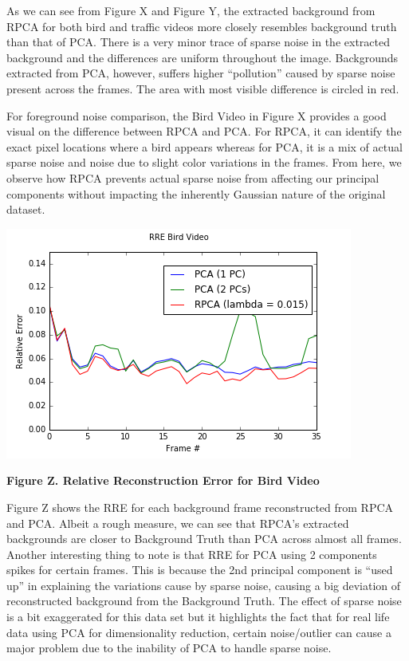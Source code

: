 \documentclass[11pt]{scrartcl} %
\theoremstyle{plain}
\begin{document}
As we can see from Figure X and Figure Y, the extracted background from RPCA for both bird and traffic videos more closely resembles background truth than that of PCA. There is a very minor trace of sparse noise in the extracted background and the differences are uniform throughout the image. Backgrounds extracted from PCA, however, suffers higher “pollution” caused by sparse noise present across the frames. The area with most visible difference is circled in red.

For foreground noise comparison, the Bird Video in Figure X provides a good visual on the difference between RPCA and PCA. For RPCA, it can identify the exact pixel locations where a bird appears whereas for PCA, it is a mix of actual sparse noise and noise due to slight color variations in the frames. From here, we observe how RPCA prevents actual sparse noise from affecting our principal components without impacting the inherently Gaussian nature of the original dataset.

\centerline{\includegraphics[width=\linewidth, width=100mm]{figures_video/crow/rre_015.png}}
\centerline{\textbf{Figure Z. Relative Reconstruction Error for Bird Video }}
\bigskip

Figure Z shows the RRE for each background frame reconstructed from RPCA and PCA. Albeit a rough measure, we can see that RPCA’s extracted backgrounds are closer to Background Truth than PCA across almost all frames. Another interesting thing to note is that RRE for PCA using 2 components spikes for certain frames. This is because the 2nd principal component is “used up” in explaining the variations cause by sparse noise, causing a big deviation of reconstructed background from the Background Truth. The effect of sparse noise is a bit exaggerated for this data set but it highlights the fact that for real life data using PCA for dimensionality reduction, certain noise/outlier can cause a major problem due to the inability of PCA to handle sparse noise.
\end{document}
